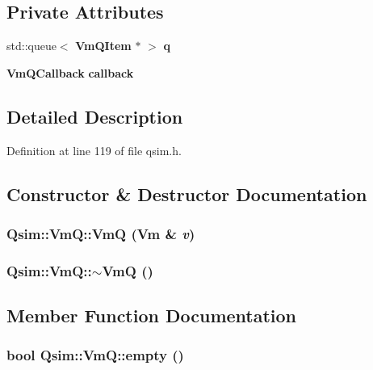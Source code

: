 \subsection*{Private Attributes}
\begin{CompactItemize}
\item 
std::queue$<$ {\bf VmQItem} $\ast$ $>$ {\bf q}
\item 
{\bf VmQCallback} {\bf callback}
\end{CompactItemize}


\subsection{Detailed Description}


Definition at line 119 of file qsim.h.

\subsection{Constructor \& Destructor Documentation}
\subsubsection[{VmQ}]{\setlength{\rightskip}{0pt plus 5cm}Qsim::VmQ::VmQ ({\bf Vm} \& {\em v})}\label{classQsim_1_1VmQ_fc30b9e3bd54e5d3f25d0c09620a9d3f}


\subsubsection[{$\sim$VmQ}]{\setlength{\rightskip}{0pt plus 5cm}Qsim::VmQ::$\sim$VmQ ()}\label{classQsim_1_1VmQ_b20664e64ffe001fec9ab36920997515}




\subsection{Member Function Documentation}
\subsubsection[{empty}]{\setlength{\rightskip}{0pt plus 5cm}bool Qsim::VmQ::empty ()\hspace{0.3cm}{\tt  [inline]}}\label{classQsim_1_1VmQ_5c0c8d1fdb1b1ee77a1e121aab636d46}




